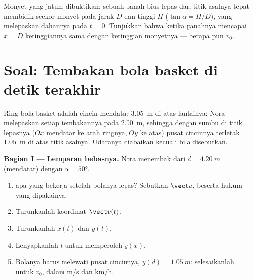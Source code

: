 \begin{exercise}[$\star\star\star$]\label{exo:g12:projectile-motion:15}
Monyet yang jatuh, dibuktikan: sebuah panah bius lepas dari titik asalnya
tepat membidik seekor monyet pada jarak $D$ dan tinggi $H$
($\tan\alpha = H/D$), yang melepaskan dahannya pada $t = 0$. Tunjukkan bahwa
ketika panahnya mencapai $x = D$ ketinggiannya sama dengan ketinggian
monyetnya --- berapa pun $v_0$.
\end{exercise}

\section{Soal: Tembakan bola basket di detik terakhir}

\begin{problem}
\label{pb:g12:projectile-motion:1}
Ring bola basket adalah cincin mendatar \qty{3.05}{m} di atas lantainya;
Nora melepaskan setiap tembakannya pada \qty{2.00}{m}, sehingga dengan sumbu
di titik lepasnya ($Ox$ mendatar ke arah ringnya, $Oy$ ke atas) pusat
cincinnya terletak \qty{1.05}{m} di atas titik asalnya. Udaranya diabaikan
kecuali bila disebutkan.

\medskip\noindent\textbf{Bagian I --- Lemparan bebasnya.} Nora menembak dari
$d = \qty{4.20}{m}$ (mendatar) dengan  $\alpha = \ang{50}$.
\begin{enumerate}
  \item {} apa yang bekerja setelah bolanya lepas? Sebutkan $\vect a$,
        beserta hukum yang dipakainya.
  \item Turunkanlah koordinat $\vect v(t)$.
  \item Turunkanlah $x(t)$ dan $y(t)$.
  \item Lenyapkanlah $t$ untuk memperoleh  $y(x)$.
  \item Bolanya harus melewati pusat cincinnya, $y(d) = \qty{1.05}{m}$:
        selesaikanlah untuk $v_0$, dalam \unit{m/s} dan \unit{km/h}.
\end{enumerate}


\end{problem}
